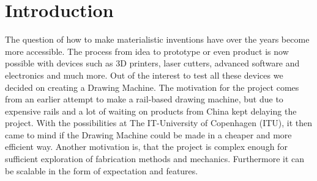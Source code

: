 
\section{Introduction}
The question of how to make materialistic inventions have over the years become more accessible. The process from idea to prototype or even product is now possible with devices such as 3D printers, laser cutters, advanced software and electronics and much more. Out of the interest to test all these devices we decided on creating a Drawing Machine. The motivation for the project comes from an earlier attempt to make a rail-based drawing machine, but due to expensive rails and a lot of waiting on products from China kept delaying the project. With the possibilities at The IT-University of Copenhagen (ITU), it then came to mind if the Drawing Machine could be made in a cheaper and more efficient way. Another motivation is, that the project is complex enough for sufficient exploration of fabrication methods and mechanics. Furthermore it can be scalable in the form of expectation and features.  

